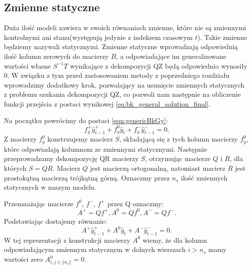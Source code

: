 \subsection{Zmienne statyczne}

Duża ilość modeli zawiera w swoich równaniach zmienne, które nie są zmiennymi kontrolnymi ani stanu(występują jedynie z indeksem czasowym $t$). Takie zmienne będziemy nazywali statycznymi. Zmienne statyczne wprowadzają odpowiednią ilość kolumn zerowych do macierzy $B$, a odpowiadające im generalizowane wartości własne $S^{-1}T$ wynikające z dekompozycji QZ będą odpowiednio wynosiły 0. W związku z tym przed zastosowaniem metody z poprzedniego rozdziału wprowadzimy dodatkowy krok, pozwalający na usunięcie zmiennych statycznych z problemu szukania dekompozycji QZ, co pozwoli nam następnie na obliczenie funkcji przejścia z postaci wynikowej \eqref{eq:bk_general_solution_final}.

Na początku powrócimy do postaci \eqref{eqn:genericBkGy}:
\begin{equation}
    f_y^+ \hat{y}^+_{t-1} + f_y^0 \hat{y}_t + f_y^- \hat{y}^-_{t-1} = 0.
\end{equation}
Z macierzy $f_y^0$ konstruujemy macierz $S$, składającą się z tych kolumn macierzy $f_y^0$, które odpowiadają kolumnom ze zmiennymi statycznymi. Następnie przeprowadzamy dekompozycję QR macierzy $S$, otrzymując macierze $Q$ i $R$, dla których $S = QR$. Macierz $Q$ jest macierzą ortogonalną, natomiast macierz $R$ jest prostokątną macierzą trójkątną górną. Oznaczmy przez $n_s$ ilość zmiennych statycznych w naszym modelu.

Przemnażając macierze $f^0$, $f^-$, $f^+$ przez Q oznaczmy:
\begin{equation}
    A^+ = Q f^+, A^0 = Q f^0, A^- = Q f^-.
\end{equation}
Podstawiając dostajemy równanie:
\begin{equation}
\label{eqn:staticQMult}
    A^+ \hat{y}^+_{t-1} + A^0 \hat{y}_t + A^- \hat{y}^-_{t-1} = 0.
\end{equation}
W tej reprezentacji z konstrukcji macierzy $A^0$ wiemy, że dla kolumn odpowiadającym zmiennym statycznym w dolnych wierszach $i > n_s$ mamy wartości zero $A^0_{i,j \in \{n_s\}} = 0$. 

